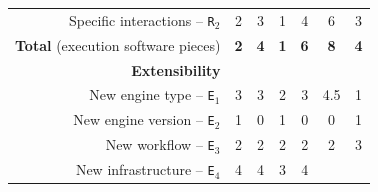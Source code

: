 \documentclass[preprint,3p,twocolumn]{elsarticle}
\newcommand{\correction}[1]{\color{blue}#1\color{black}\xspace}
\begin{document}
\begin{table}
\begin{tabular}{rcccccc}
  Specific interactions -- \texttt{R$_2$} & \cellcolor[HTML]{99EB99}2
                                     & \cellcolor[HTML]{99D699}3
                                     & \cellcolor[HTML]{99FF99}1
                                     & \cellcolor[HTML]{99C299}4
                                     & \cellcolor[HTML]{999999}6
                                     & \cellcolor[HTML]{99D699}3\\
  \textbf{Total} (execution software pieces)& \cellcolor[HTML]{99F099}\textbf{2}
                                     & \cellcolor[HTML]{99D399}\textbf{4}
                                     & \cellcolor[HTML]{99FF99}\textbf{1}
                                     & \cellcolor[HTML]{99B699}\textbf{6}
                                     & \cellcolor[HTML]{999999}\textbf{8}
                                     & \cellcolor[HTML]{99D399}\textbf{4}\\
\cellcolor[HTML]{EEEEEE}\textbf{Extensibility}& \multicolumn{6}{l}{\cellcolor[HTML]{EEEEEE}}\\
  New engine type -- \texttt{E$_1$}  & \cellcolor[HTML]{99C599}3
                                     & \cellcolor[HTML]{99A899}\correction{3}
                                     & \cellcolor[HTML]{99E299}2
                                     & \cellcolor[HTML]{99C599}3
                                     & \cellcolor[HTML]{999999}4.5
                                     & \cellcolor[HTML]{99FF99}1\\
New engine version -- \texttt{E$_2$} & \cellcolor[HTML]{999999}1
                                     & \cellcolor[HTML]{99FF99}0
                                     & \cellcolor[HTML]{999999}1
                                     & \cellcolor[HTML]{99FF99}0
                                     & \cellcolor[HTML]{99FF99}0
                                     & \cellcolor[HTML]{999999}1\\
  New workflow -- \texttt{E$_3$} & \cellcolor[HTML]{99FF99}2
                                     & \cellcolor[HTML]{99FF99}2
                                     & \cellcolor[HTML]{99FF99}2
                                     & \cellcolor[HTML]{99FF99}2
                                     & \cellcolor[HTML]{99FF99}2
                                     & \cellcolor[HTML]{999999}3\\
New infrastructure -- \texttt{E$_4$} & \cellcolor[HTML]{99DD99}4
                                     & \cellcolor[HTML]{99DD99}4
                                     & \cellcolor[HTML]{99FF99}3
                                     & \cellcolor[HTML]{99DD99}4

\end{tabular}
\end{table}
\end{document}
